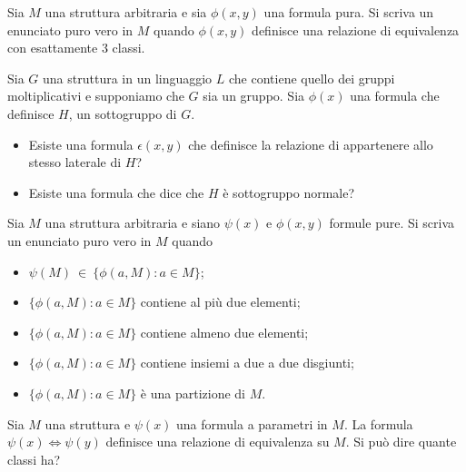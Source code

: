 \begin{exercise}
Sia $M$ una struttura arbitraria e sia  $\phi(x,y)$ una formula pura. Si scriva un enunciato puro vero in $M$ quando $\phi(x,y)$ definisce una relazione di equivalenza con esattamente $3$ classi.
\end{exercise}

\begin{exercise} 
Sia $G$ una struttura in un linguaggio $L$ che contiene quello dei gruppi moltiplicativi e supponiamo che $G$ sia un gruppo. Sia $\phi(x)$ una formula che definisce $H$, un sottogruppo di $G$.
\begin{itemize}
\item[a.] Esiste una formula $\epsilon(x,y)$ che definisce la relazione di appartenere allo stesso laterale di $H$?
\item[b.] Esiste una formula che dice che $H$ \`e sottogruppo normale?
\end{itemize}
\end{exercise}

\begin{exercise}
Sia $M$ una struttura arbitraria e siano $\psi(x)$ e $\phi(x,y)$ formule pure. Si scriva un enunciato puro vero in $M$ quando
\begin{itemize}
\item[a.] $\psi(M)\ \in\ \{\phi(a,M): a\in M\}$;
\item[b.] $\{\phi(a,M): a\in M\}$ contiene al pi\`u due elementi;
\item[c.] $\{\phi(a,M): a\in M\}$ contiene almeno due elementi;
\item[d.] $\{\phi(a,M): a\in M\}$ contiene insiemi a due a due disgiunti;
\item[e.] $\{\phi(a,M): a\in M\}$ \`e una partizione di $M$.
\end{itemize}
\end{exercise}

\begin{exercise}
Sia $M$ una struttura e $\psi(x)$ una formula a parametri in $M$.  La formula $\psi(x)\iff\psi(y)$ definisce  una relazione di equivalenza su $M$. Si pu\`o dire quante classi ha?
\end{exercise}

